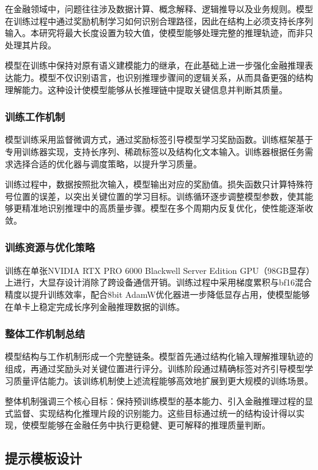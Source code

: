 \documentclass[professional,privacy,print,win,long,STEM,AutoFakeBold]{def/buaa}
\begin{document}
在金融领域中，问题往往涉及数据计算、概念解释、逻辑推导以及业务规则。模型在训练过程中通过奖励机制学习如何识别合理路径，因此在结构上必须支持长序列输入。本研究将最大长度设置为较大值，使模型能够处理完整的推理轨迹，而非只处理其片段。

模型在训练中保持对原有语义建模能力的继承，在此基础上进一步强化金融推理表达能力。模型不仅识别语言，也识别推理步骤间的逻辑关系，从而具备更强的结构理解能力。这种设计使模型能够从长推理链中提取关键信息并判断其质量。

\subsubsection{训练工作机制}

模型训练采用监督微调方式，通过奖励标签引导模型学习奖励函数。训练框架基于专用训练器实现，支持长序列、稀疏标签以及结构化文本输入。训练器根据任务需求选择合适的优化器与调度策略，以提升学习质量。

训练过程中，数据按照批次输入，模型输出对应的奖励值。损失函数只计算特殊符号位置的误差，以突出关键位置的学习目标。训练循环逐步调整模型参数，使其能够更精准地识别推理中的高质量步骤。模型在多个周期内反复优化，使性能逐渐收敛。

\subsubsection{训练资源与优化策略}

训练在单张NVIDIA RTX PRO 6000 Blackwell Server Edition GPU（98GB显存）上进行，大显存设计消除了跨设备通信开销。训练过程中采用梯度累积与bf16混合精度以提升训练效率，配合8bit AdamW优化器进一步降低显存占用，使模型能够在单卡上稳定完成长序列金融推理数据的训练。

\subsubsection{整体工作机制总结}

模型结构与工作机制形成一个完整链条。模型首先通过结构化输入理解推理轨迹的组成，再通过奖励头对关键位置进行评分。训练阶段通过精确标签对齐引导模型学习质量评估能力。该训练机制使上述流程能够高效地扩展到更大规模的训练场景。

整体机制强调三个核心目标：保持预训练模型的基本能力、引入金融推理过程的显式监督、实现结构化推理片段的识别能力。这些目标通过统一的结构设计得以实现，使模型能够在金融任务中执行更稳健、更可解释的推理质量判断。

\subsection{提示模板设计}
\end{document}
